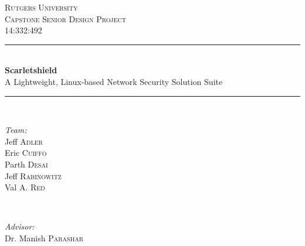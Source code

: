 \documentclass[12pt,letterpaper,titlepage]{report}
\begin{document}
\begin{titlepage}

\newcommand{\HRule}{\rule{\linewidth}{0.5mm}} %


\center %
 

\textsc{\LARGE Rutgers University}\\[1.5cm] %
\textsc{\Large Capstone Senior Design Project}\\[0.5cm] %
\textsc{\large 14:332:492}\\[1.0cm] %


\HRule \\[0.4cm]
{ \huge \bfseries Scarletshield}\\
  \Large A Lightweight, Linux-based Network Security Solution Suite \\[0.4cm] %
\HRule \\[3.5cm]
 

\begin{minipage}{0.4\textwidth}
\begin{flushleft} \large
\emph{Team:}\\
Jeff \textsc{Adler}\\ %
Eric \textsc{Cuiffo}\\
Parth \textsc{Desai}\\
Jeff \textsc{Rabinowitz}\\
Val A. \textsc{Red}
\end{flushleft}
\end{minipage}
~
\begin{minipage}{0.4\textwidth}
\begin{flushright} \large
\emph{Advisor:} \\
Dr. Manish \textsc{Parashar} %
\end{flushright}
\end{minipage}\\[4cm]


\end{titlepage}
\end{document}

